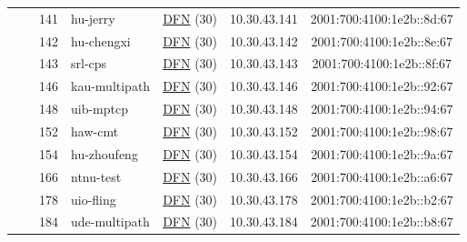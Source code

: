 \begin{small}
\begin{center}
\begin{longtable}{|c|c|c|c|c|c|c|c|}
  &  & \tiny{141} & \multicolumn{1}{|l|}{\tiny{hu-jerry}} & \multicolumn{2}{|c|}{\tiny{\href{https://www.dfn.de}{DFN} (30)}} & \tiny{10.30.43.141} & \tiny{2001:700:4100:1e2b::8d:67} \\* \cline{3-3}\cline{4-4}\cline{5-5}\cline{6-6}\cline{7-7}\cline{8-8}
  &  & \tiny{142} & \multicolumn{1}{|l|}{\tiny{hu-chengxi}} & \multicolumn{2}{|c|}{\tiny{\href{https://www.dfn.de}{DFN} (30)}} & \tiny{10.30.43.142} & \tiny{2001:700:4100:1e2b::8e:67} \\* \cline{3-3}\cline{4-4}\cline{5-5}\cline{6-6}\cline{7-7}\cline{8-8}
  &  & \tiny{143} & \multicolumn{1}{|l|}{\tiny{srl-cps}} & \multicolumn{2}{|c|}{\tiny{\href{https://www.dfn.de}{DFN} (30)}} & \tiny{10.30.43.143} & \tiny{2001:700:4100:1e2b::8f:67} \\* \cline{3-3}\cline{4-4}\cline{5-5}\cline{6-6}\cline{7-7}\cline{8-8}
  &  & \tiny{146} & \multicolumn{1}{|l|}{\tiny{kau-multipath}} & \multicolumn{2}{|c|}{\tiny{\href{https://www.dfn.de}{DFN} (30)}} & \tiny{10.30.43.146} & \tiny{2001:700:4100:1e2b::92:67} \\* \cline{3-3}\cline{4-4}\cline{5-5}\cline{6-6}\cline{7-7}\cline{8-8}
  &  & \tiny{148} & \multicolumn{1}{|l|}{\tiny{uib-mptcp}} & \multicolumn{2}{|c|}{\tiny{\href{https://www.dfn.de}{DFN} (30)}} & \tiny{10.30.43.148} & \tiny{2001:700:4100:1e2b::94:67} \\* \cline{3-3}\cline{4-4}\cline{5-5}\cline{6-6}\cline{7-7}\cline{8-8}
  &  & \tiny{152} & \multicolumn{1}{|l|}{\tiny{haw-cmt}} & \multicolumn{2}{|c|}{\tiny{\href{https://www.dfn.de}{DFN} (30)}} & \tiny{10.30.43.152} & \tiny{2001:700:4100:1e2b::98:67} \\* \cline{3-3}\cline{4-4}\cline{5-5}\cline{6-6}\cline{7-7}\cline{8-8}
  &  & \tiny{154} & \multicolumn{1}{|l|}{\tiny{hu-zhoufeng}} & \multicolumn{2}{|c|}{\tiny{\href{https://www.dfn.de}{DFN} (30)}} & \tiny{10.30.43.154} & \tiny{2001:700:4100:1e2b::9a:67} \\* \cline{3-3}\cline{4-4}\cline{5-5}\cline{6-6}\cline{7-7}\cline{8-8}
  &  & \tiny{166} & \multicolumn{1}{|l|}{\tiny{ntnu-test}} & \multicolumn{2}{|c|}{\tiny{\href{https://www.dfn.de}{DFN} (30)}} & \tiny{10.30.43.166} & \tiny{2001:700:4100:1e2b::a6:67} \\* \cline{3-3}\cline{4-4}\cline{5-5}\cline{6-6}\cline{7-7}\cline{8-8}
  &  & \tiny{178} & \multicolumn{1}{|l|}{\tiny{uio-fling}} & \multicolumn{2}{|c|}{\tiny{\href{https://www.dfn.de}{DFN} (30)}} & \tiny{10.30.43.178} & \tiny{2001:700:4100:1e2b::b2:67} \\* \cline{3-3}\cline{4-4}\cline{5-5}\cline{6-6}\cline{7-7}\cline{8-8}
  &  & \tiny{184} & \multicolumn{1}{|l|}{\tiny{ude-multipath}} & \multicolumn{2}{|c|}{\tiny{\href{https://www.dfn.de}{DFN} (30)}} & \tiny{10.30.43.184} & \tiny{2001:700:4100:1e2b::b8:67} \\ \hline
\end{longtable}
\end{center}
\end{small}




